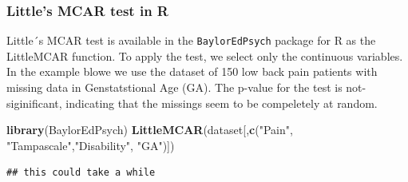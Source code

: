 \documentclass[]{book}
\newenvironment{Shaded}{\begin{snugshade}}{\end{snugshade}}
\newcommand{\KeywordTok}[1]{\textcolor[rgb]{0.13,0.29,0.53}{\textbf{#1}}}
\newcommand{\StringTok}[1]{\textcolor[rgb]{0.31,0.60,0.02}{#1}}
\newcommand{\NormalTok}[1]{#1}
\begin{document}
\subsubsection{Little's MCAR test in R}\label{littles-mcar-test-in-r}

Little´s MCAR test is available in the \texttt{BaylorEdPsych} package
for R as the LittleMCAR function. To apply the test, we select only the
continuous variables. In the example blowe we use the dataset of 150 low
back pain patients with missing data in Genstatstional Age (GA). The
p-value for the test is not-siginificant, indicating that the missings
seem to be compeletely at random.

\begin{Shaded}
\begin{Highlighting}[]
\KeywordTok{library}\NormalTok{(BaylorEdPsych)}
\KeywordTok{LittleMCAR}\NormalTok{(dataset[,}\KeywordTok{c}\NormalTok{(}\StringTok{"Pain"}\NormalTok{, }\StringTok{"Tampascale"}\NormalTok{,}\StringTok{"Disability"}\NormalTok{, }\StringTok{"GA"}\NormalTok{)])}
\end{Highlighting}
\end{Shaded}

\begin{verbatim}
## this could take a while
\end{verbatim}
\end{document}
